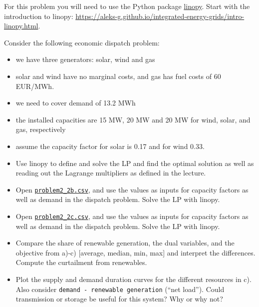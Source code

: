 \documentclass[10pt]{article}
\newenvironment{problem}[2][Problem]{\begin{trivlist}
\item[\hskip \labelsep {\bfseries #1}\hskip \labelsep {\bfseries #2.}]}{\end{trivlist}}
\begin{document}
\begin{problem}{2.2}
	For this problem you will need to use the Python package \href{https://linopy.readthedocs.io/en/latest/}{linopy}. Start with the introduction to linopy: \url{https://aleks-g.github.io/integrated-energy-grids/intro-linopy.html}.

	
	Consider the following economic dispatch problem: 
	\begin{itemize}
		\item we have three generators: solar, wind and gas
		\item solar and wind have no marginal costs, and gas has fuel costs of 60 EUR/MWh.
		\item we need to cover demand of 13.2 MWh
		\item the installed capacities are 15 MW, 20 MW and 20 MW for wind, solar, and gas, respectively
		\item assume the capacity factor for solar is 0.17 and for wind 0.33.
	\end{itemize}

	
	\begin{itemize}
		\item[a)] Use linopy to define and solve the LP and find the optimal solution as well as reading out the Lagrange multipliers as defined in the lecture. 
		\item[b)] Open \href{https://github.com/aleks-g/integrated-energy-grids/tree/main/integrated-energy-grids/Problems/data/problem2_2b.csv}{\texttt{problem2\_2b.csv}}, and use the values as inputs for capacity factors as well as demand in the dispatch problem. Solve the LP with linopy.
		\item[c)] Open \href{https://github.com/aleks-g/integrated-energy-grids/tree/main/integrated-energy-grids/Problems/data/problem2_2c.csv}{\texttt{problem2\_2c.csv}}, and use the values as inputs for capacity factors as well as demand in the dispatch problem. Solve the LP with linopy.
		\item[d)] Compare the share of renewable generation, the dual variables, and the objective from a)-c) [average, median, min, max] and interpret the differences. Compute the curtailment from renewables.
		\item[e)] Plot the supply and demand duration curves for the different resources in c). Also consider \texttt{demand - renewable generation} (``net load''). Could transmission or storage be useful for this system? Why or why not?
	\end{itemize}

\end{problem}
\end{document}
